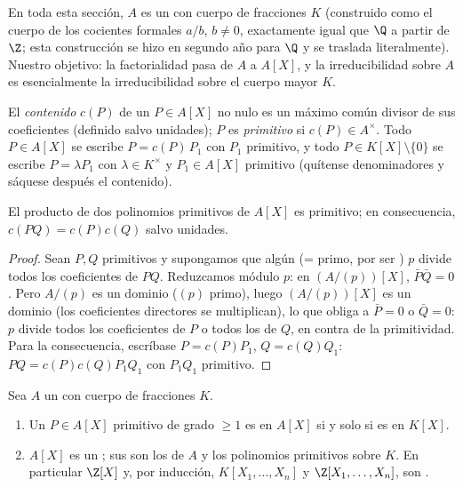 En toda esta sección, $A$ es un  con
cuerpo de fracciones $K$ (construido como el cuerpo de los cocientes
formales $a/b$, $b \neq 0$, exactamente igual que $\Q$ a partir de $\Z$;
esta construcción se hizo en segundo año para $\Q$ y se traslada
literalmente). Nuestro objetivo: la factorialidad pasa de $A$ a $A[X]$,
y la irreducibilidad sobre $A$ es esencialmente la irreducibilidad sobre
el cuerpo mayor $K$.

\begin{definition}\label{def:b3:rings:content}
El \emph{contenido} $c(P)$ de un
$P \in A[X]$ no nulo es un máximo común divisor de sus coeficientes
(definido salvo unidades); $P$ es \emph{primitivo} si
$c(P) \in A^\times$. Todo $P
\in A[X]$ se escribe $P = c(P)\,P_1$ con $P_1$ primitivo, y todo
$P \in K[X]\setminus\{0\}$ se escribe $P = \lambda P_1$ con $\lambda
\in K^\times$ y $P_1 \in A[X]$ primitivo (quítense denominadores y
sáquese después el contenido).
\end{definition}

\begin{lemma}[Gauss]\label{lem:b3:rings:gauss}
El producto de dos polinomios primitivos de $A[X]$ es primitivo; en
consecuencia, $c(PQ) = c(P)c(Q)$ salvo unidades.
\end{lemma}

\begin{proof}
Sean $P, Q$ primitivos y supongamos que algún
 (= primo, por ser
) $p$ divide todos los coeficientes de
$PQ$. Reduzcamos módulo $p$: en $(A/(p))[X]$, $\bar P \bar Q = 0$. Pero
$A/(p)$ es un dominio ($(p)$ primo), luego $(A/(p))[X]$ es un dominio
(los coeficientes directores se multiplican), lo que obliga a
$\bar P = 0$ o $\bar Q = 0$: $p$ divide todos los coeficientes de $P$ o
todos los de $Q$, en contra de la primitividad. Para la consecuencia,
escríbase $P = c(P)P_1$, $Q = c(Q)Q_1$: $PQ =
c(P)c(Q) P_1Q_1$ con $P_1Q_1$ primitivo.
\end{proof}

\begin{theorem}\label{thm:b3:rings:gaussufd}
Sea $A$ un  con cuerpo de fracciones
$K$.
\begin{enumerate}
  \item Un $P \in A[X]$ primitivo de grado $\geq 1$ es
   en $A[X]$ si y solo si
  es  en $K[X]$. \item
  $A[X]$ es un ; sus
   son los
   de $A$ y los
  polinomios primitivos 
  sobre $K$. En particular $\Z[X]$ y, por inducción,
  $K[X_1, \dots, X_n]$ y $\Z[X_1, \dots, X_n]$, son
  .
\end{enumerate}
\end{theorem}

